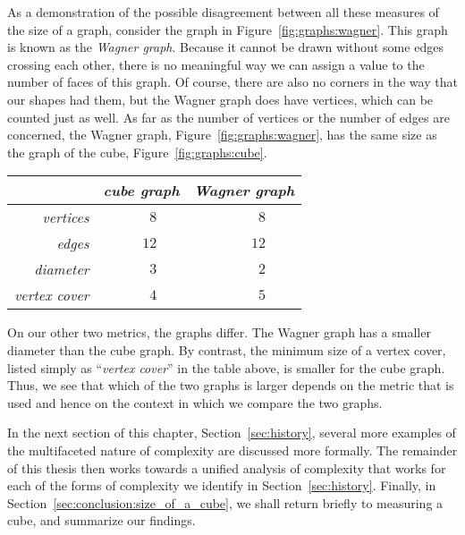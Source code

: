 As a demonstration of the possible disagreement between all these measures of the size of a graph, consider the graph in Figure~\ref{fig:graphs:wagner}.
This graph is known as the \emph{Wagner graph}.
Because it cannot be drawn without some edges crossing each other, there is no meaningful way we can assign a value to the number of faces of this graph.
Of course, there are also no corners in the way that our shapes had them, but the Wagner graph does have vertices, which can be counted just as well.
As far as the number of vertices or the number of edges are concerned, the Wagner graph, Figure~\ref{fig:graphs:wagner}, has the same size as the graph of the cube, Figure~\ref{fig:graphs:cube}.
\begin{center}
  \begin{tabular}{r|p{2em}rp{1em}p{2em}rp{1em}}
    &	\multicolumn{3}{c}{\emph{cube graph}}	& \multicolumn{3}{c}{\emph{Wagner graph}} \\
    \hline
    \emph{vertices}	&& $8$	&&& $8$ \\
    \emph{edges}	&& $12$	&&& $12$	& \hspace{0pt} \\
    \emph{diameter}	&& $3$	&&& $2$ \\
    \emph{vertex cover}	&& $4$	&&& $5$
  \end{tabular}
\end{center}
On our other two metrics, the graphs differ.
The Wagner graph has a smaller diameter than the cube graph.
By contrast, the minimum size of a vertex cover, listed simply as \enquote{\emph{vertex cover}} in the table above, is smaller for the cube graph.
Thus, we see that which of the two graphs is larger depends on the metric that is used and hence on the context in which we compare the two graphs.

\medbreak
In the next section of this chapter, Section~\ref{sec:history}, several more examples of the multifaceted nature of complexity are discussed more formally.
The remainder of this thesis then works towards a unified analysis of complexity that works for each of the forms of complexity we identify in Section~\ref{sec:history}.
Finally, in Section~\ref{sec:conclusion:size_of_a_cube}, we shall return briefly to measuring a cube, and summarize our findings.


\label{sec:history}%

